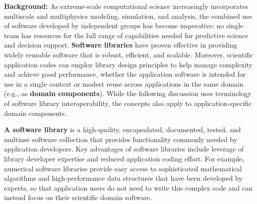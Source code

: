 \documentclass[]{article}
\date{}
\begin{document}
\pagestyle{fancy}
\renewcommand{\headrulewidth}{0pt}
  
\thispagestyle{empty}
\textbf{\newline}
\textbf{\newline}
\textbf{\newline}

\textbf{Background:} As extreme-scale computational science increasingly
incorporates multiscale and multiphysics modeling, simulation, and
analysis, the combined use of software developed by independent groups
has become imperative: no single team has resources for the full range
of capabilities needed for predictive science and decision support.
\textbf{Software libraries} have proven effective in providing widely
reusable software that is robust, efficient, and scalable. Moreover,
scientific application codes can employ library design principles to
help manage complexity and achieve good performance, whether the
application software is intended for use in a single context or modest
reuse across applications in the same domain (e.g., as \textbf{domain
components}). While the following discussion uses terminology of
software library interoperability, the concepts also apply to
application-specific domain components.

\textbf{A software library} is a high-quality, encapsulated, documented,
tested, and multiuse software collection that provides functionality
commonly needed by application developers. Key advantages of software
libraries include leverage of library developer expertise and reduced
application coding effort. For example, numerical software libraries
provide easy access to sophisticated mathematical algorithms and
high-performance data structures that have been developed by experts, so
that application users do not need to write this complex code and can
instead focus on their scientific domain software.
\end{document}
